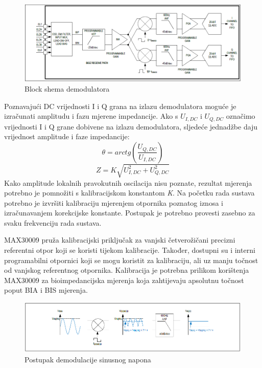 \documentclass[../diplomski_rad.tex]{subfiles}
\begin{document}
\begin{figure}[htb]
    \centering
    \includegraphics[width=1\textwidth]{Figures/max30009_receive.png} 
    \caption{Block shema demodulatora \cite{max30009_datasheet}}
    \label{slk:max30009_receive}
\end{figure}

Poznavajući DC vrijednosti I i Q grana na izlazu demodulatora moguće je izračunati amplitudu i fazu mjerene impedancije.
Ako s $U_{I,DC}$ i $U_{Q,DC}$ označimo vrijednosti I i Q grane dobivene na izlazu demodulatora, 
sljedeće jednadžbe daju vrijednost amplitude i faze impedancije:
\begin{equation}
    \label{jed:cpe}
    \theta = arctg(\frac{U_{Q,DC}}{U_{I,DC}})
\end{equation} 
\begin{equation}
    \label{jed:cpe}
    Z = K\sqrt{U_{I,DC}^2+U_{Q,DC}^2}
\end{equation} 
Kako amplitude lokalnih pravokutnih oscilacija nisu poznate, rezultat mjerenja potrebno je pomnožiti s kalibracijskom 
konstantom \textit{K}. Na početku rada sustava potrebno je izvršiti kalibraciju mjerenjem otpornika poznatog iznosa i 
izračunavanjem korekcijske konstante. Postupak je potrebno provesti zasebno za svaku frekvenciju rada sustava.

MAX30009 pruža kalibracijski priključak za vanjski četverožičani precizni referentni otpor koji se koristi tijekom kalibracije. 
Također, dostupni su i interni programabilni otpornici koji se mogu koristit za kalibraciju, ali uz manju točnost od vanjskog referentnog otpornika.
Kalibracija je potrebna prilikom korištenja MAX30009 za bioimpedancijska mjerenja koja zahtijevaju apsolutnu točnost poput BIA i BIS mjerenja.

\begin{figure}[htb]
    \centering
    \includegraphics[width=1\textwidth]{Figures/max30009_demodulator.png} 
    \caption{Postupak demodulacije sinusnog napona \cite{max30009_datasheet}}
    \label{slk:max30009_demodulator}
\end{figure}
\end{document}
